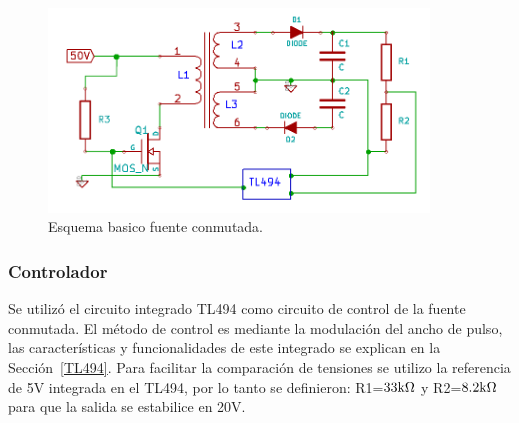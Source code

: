 \begin{figure}[H]
\centering
\includegraphics[width=0.90\textwidth]{img/conmutada_basica.png}
\caption{Esquema  basico fuente conmutada.}
\label{conmutada_basica}
\end{figure}

\subsubsection{Controlador}

Se utilizó el circuito integrado TL494 como circuito de control de la fuente conmutada. El método de control es mediante la modulación del ancho de pulso, las características y funcionalidades de este integrado se explican en la Sección~\ref{TL494}. Para facilitar la comparación de tensiones se utilizo la referencia de 5V integrada en el TL494, por lo tanto se definieron: R1=$33\mbox{k}\Omega $ y R2=$8.2\mbox{k}\Omega$ para que la salida se estabilice en 20V.
